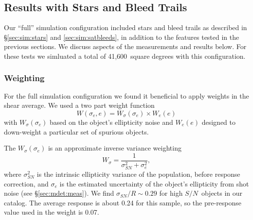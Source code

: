 \documentclass[twocolumn,twocolappendix,astrosym]{openjournal}
\newcommand{\snr}{$S/N$}
\newcommand{\fullarea}{41,600}
\begin{document}
\subsection{Results with Stars and Bleed Trails} \label{sec:results:full}

Our ``full'' simulation configuration included stars and bleed trails as
described in \S \ref{sec:sim:stars} and \ref{sec:sim:satbleeds}, in addition to
the features tested in the previous sections.   We discuss aspects of the
measurements and results below. For these tests we simluated a total of \fullarea\
square degrees with this configuration.

\subsubsection{Weighting}

For the full simulation configuration we found it beneficial to apply weights
in the shear average.  We used a two part weight function
\begin{equation}
    W(\sigma_e, e) = W_\sigma (\sigma_e) \times W_e(e)
\end{equation}
with $W_\sigma(\sigma_e)$ based on the object's ellipticity noise and $W_e(e)$
designed to down-weight a particular set of spurious objects.

The $W_\sigma(\sigma_e)$ is an approximate inverse variance weighting
\begin{equation} \label{eq:wsigma}
    W_\sigma = \frac{1}{\sigma_{SN}^2 + \sigma_e^2},
\end{equation}
where $\sigma^2_{SN}$ is the intrinsic ellipticity variance of the population,
before response correction, and $\sigma_e$ is the estimated uncertainty of the
object's ellipticity from shot noise (see \S \ref{sec:mdet:meas}).  We find
$\sigma_{SN}/R \sim 0.29$ for high \snr\ objects in our catalog.  The average
response is about 0.24 for this sample, so the pre-response value used
in the weight is 0.07.
\end{document}

